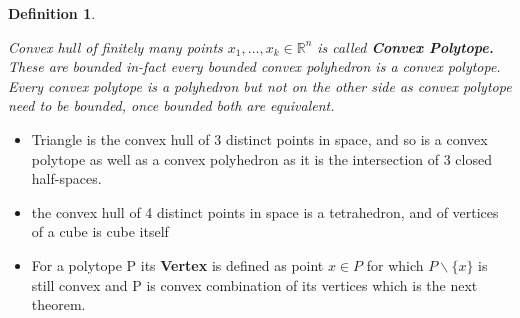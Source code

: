 \documentclass[oneside]{book}
\newtheorem{mydef}{Definition}[section]
\begin{document}
	\begin{mydef} \label{d:6}
		
		Convex hull of finitely many points $x_1,\ldots ,x_k \in \mathbb{R}^n $ is called \textbf{Convex Polytope.} 
		These are bounded in-fact every bounded convex polyhedron  is a convex polytope.\\
		Every convex polytope is a polyhedron but not on the other side as convex polytope need to be bounded, once bounded both are equivalent.
		
		
	\end{mydef}
	
	
	\begin{itemize}
		\item
		
		Triangle is the convex hull of 3 distinct points in space, and so is a convex polytope as well as a convex polyhedron as it is the intersection of 3 closed half-spaces.
		
		\item
		the convex hull of 4 distinct points in space is a tetrahedron, and of vertices of a cube is cube itself 
		
		\item
		For a polytope P its \textbf{Vertex} is defined as point $x \in P$ for which $P \backslash \{x\} $ is  still convex and P is convex combination of its vertices which is  the next theorem. 
	\end{itemize}
	
	
	
	
	
	
	
	
	
	
\end{document}
